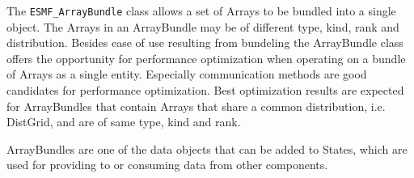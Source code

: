 
The {\tt ESMF\_ArrayBundle} class allows a set of Arrays to be bundled into a
single object. The Arrays in an ArrayBundle may be of different type, kind,
rank and distribution. Besides ease of use resulting from bundeling the
ArrayBundle class offers the opportunity for performance optimization when
operating on a bundle of Arrays as a single entity. Especially communication
methods are good candidates for performance optimization. Best optimization
results are expected for ArrayBundles that contain Arrays that share a common
distribution, i.e. DistGrid, and are of same type, kind and rank.

ArrayBundles are one of the data objects that can be added to States,
which are used for providing to or consuming data from other components.
